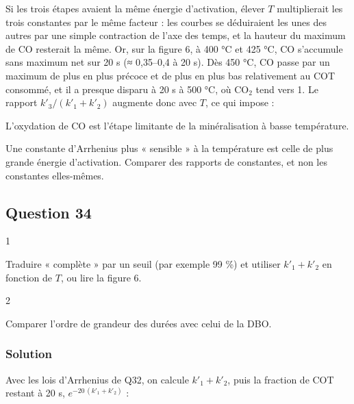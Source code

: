 \documentclass[11pt,a4paper]{article}
\newcommand{\equationajustee}[1]{%
  \sbox{\boiteequation}{$\displaystyle #1$}%
  \ifdim\wd\boiteequation>\linewidth
    \[\resizebox{\linewidth}{!}{\usebox{\boiteequation}}\]%
  \else
    \[#1\]%
  \fi}
\begin{document}
Si les trois étapes avaient la même énergie d'activation, élever \(T\) multiplierait les trois constantes par le même facteur : les courbes se déduiraient les unes des autres par une simple contraction de l'axe des temps, et la hauteur du maximum de CO resterait la même. Or, sur la figure 6, à 400 °C et 425 °C, CO s'accumule sans maximum net sur 20 s (≈ 0,35--0,4 à 20 s). Dès 450 °C, CO passe par un maximum de plus en plus précoce et de plus en plus bas relativement au COT consommé, et il a presque disparu à 20 s à 500 °C, où CO\(_2\) tend vers 1. Le rapport \(k'_3/(k'_1+k'_2)\) augmente donc avec \(T\), ce qui impose :

\equationajustee{\boxed{E_{a3}>E_{a1}\ \text{et}\ E_{a3}>E_{a2}}}

L'oxydation de CO est l'étape limitante de la minéralisation à basse température.

\begin{methode}

Une constante d'Arrhenius plus « sensible » à la température est celle de plus grande énergie d'activation. Comparer des rapports de constantes, et non les constantes elles-mêmes.

\end{methode}

\hypertarget{question-34}{%
\subsection{Question 34}\label{question-34}}

\begin{indication}{1}

Traduire « complète » par un seuil (par exemple 99 \%) et utiliser \(k'_1+k'_2\) en fonction de \(T\), ou lire la figure 6.

\end{indication}

\begin{indication}{2}

Comparer l'ordre de grandeur des durées avec celui de la DBO.

\end{indication}

\hypertarget{solution-33}{%
\subsubsection{Solution}\label{solution-33}}

Avec les lois d'Arrhenius de Q32, on calcule \(k'_1+k'_2\), puis la fraction de COT restant à 20 s, \(e^{-20\,(k'_1+k'_2)}\) :
\end{document}
